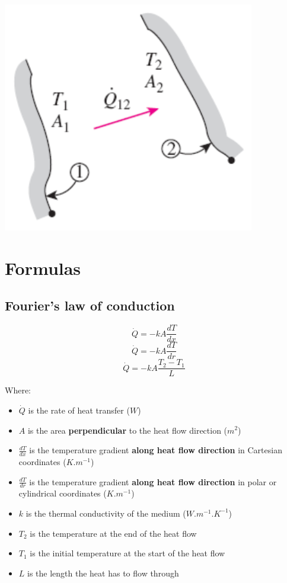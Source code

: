 \documentclass[11pt]{article}
\begin{document}
\begin{center}
\includegraphics[width=.9\linewidth]{./images/radiation-exchange-within-enclosure-with-n-surfaces-diagram.png}
\end{center}

 \newpage
\section{Formulas}
\label{sec:org43c5b31}

\subsection{Fourier's law of conduction}
\label{sec:org4506b08}
\[\dot{Q} = -kA \frac{dT}{dx}\]
\[\dot{Q} = -kA \frac{dT}{dr}\]
\[\dot{Q} = -kA \frac{T_2 - T_1}{L}\]

Where:
\begin{itemize}
\item \(\dot{Q}\) is the rate of heat transfer (\(\unit{W}\))
\item \(A\) is the area \textbf{perpendicular} to the heat flow direction (\(\unit{m^2}\))
\item \(\frac{dT}{dx}\) is the temperature gradient \textbf{along heat flow direction} in Cartesian coordinates (\(\unit{K.m^{-1}}\))
\item \(\frac{dT}{dr}\) is the temperature gradient \textbf{along heat flow direction} in polar or cylindrical coordinates (\(\unit{K.m^{-1}}\))
\item \(k\) is the thermal conductivity of the medium (\(\unit{W.m^{-1}.K^{-1}}\))
\item \(T_2\) is the temperature at the end of the heat flow
\item \(T_1\) is the initial temperature at the start of the heat flow
\item \(L\) is the length the heat has to flow through
\end{itemize}
\end{document}
